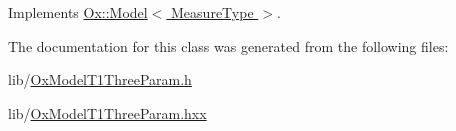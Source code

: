 Implements \hyperlink{class_ox_1_1_model_a694868476dd17a4d203f4ebc57047d2f}{Ox\+::\+Model$<$ Measure\+Type $>$}.



The documentation for this class was generated from the following files\+:\begin{DoxyCompactItemize}
\item 
lib/\hyperlink{_ox_model_t1_three_param_8h}{Ox\+Model\+T1\+Three\+Param.\+h}\item 
lib/\hyperlink{_ox_model_t1_three_param_8hxx}{Ox\+Model\+T1\+Three\+Param.\+hxx}\end{DoxyCompactItemize}
